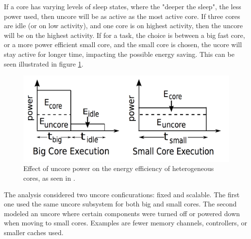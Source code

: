 If a core has varying levels of sleep states, where the "deeper the sleep", the less power used, then uncore will be as active as the most active core.
If three cores are idle (or on low activity), and one core is on highest activity, then the uncore will be on the highest activity.
If for a task, the choice is between a big fast core, or a more power efficient small core, and the small core is chosen, the ucore will stay active for longer time, impacting the possible energy saving.
This can be seen illustrated in figure \ref{fig:Uncore1}.

\begin{figure}[htb]
    \centering
    \includegraphics[width=1.0\textwidth]{Figures/Heterogeneous/Uncore1}
    \caption{Effect of uncore power on the energy efficiency of heterogeneous cores, as seen in \cite{heterogeneous-uncore}.}
    \label{fig:Uncore1}
\end{figure}



The analysis considered two uncore conficurations: fixed and scalable.
The first one used the same uncore subsystem for both big and small cores.
The second modeled an uncore where certain components were turned off or powered down when moving to small cores.
Examples are fewer memory channels, controllers, or smaller caches used.  

